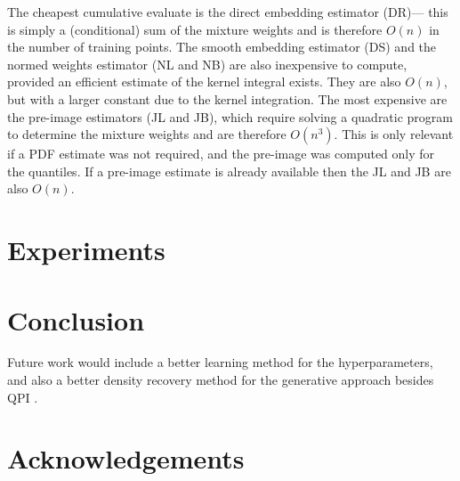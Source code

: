 \documentclass[twoside]{article} \usepackage{aistats2017}
\theoremstyle{definition}
\theoremstyle{remark}
\newcommand{\warn}[1]{{\color{RedOrange} #1}}
\newcommand{\qpi}{QPI }
\begin{document}
	The cheapest cumulative evaluate is the direct embedding estimator (DR)--- this is simply a (conditional) sum of the mixture weights and is therefore $O(n)$ in the number of training points. The smooth embedding estimator (DS) and the normed weights estimator (NL and NB) are also inexpensive to compute, provided an efficient estimate of the kernel integral exists. They are also $O(n)$, but with a larger constant due to the kernel integration. The most expensive are the pre-image estimators (JL and JB), which require solving a quadratic program to determine the mixture weights and are therefore $O(n^3)$. This is only relevant if a PDF estimate was not required, and the pre-image was computed only for the quantiles. If a pre-image estimate is already available then the JL and JB are also $O(n)$.
	
\section{Experiments}
\label{sec:experiments}

\section{Conclusion}
\label{sec:conclusion}

	\warn{Future work would include a better learning method for the hyperparameters, and also a better density recovery method for the generative approach besides \qpi.}
	

\section*{Acknowledgements}



\end{document}
